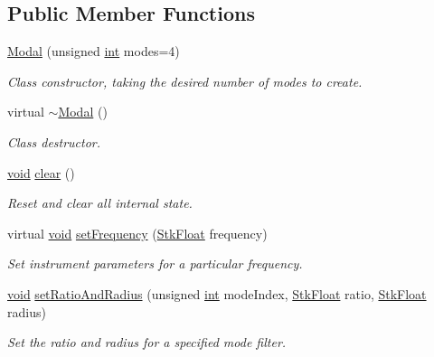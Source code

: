 \subsection*{Public Member Functions}
\begin{DoxyCompactItemize}
\item 
\hyperlink{class_nyq_1_1_modal_a2faf9b2ff8f531a0436972d9abb8fe3d}{Modal} (unsigned \hyperlink{xmltok_8h_a5a0d4a5641ce434f1d23533f2b2e6653}{int} modes=4)
\begin{DoxyCompactList}\small\item\em Class constructor, taking the desired number of modes to create. \end{DoxyCompactList}\item 
virtual \hyperlink{class_nyq_1_1_modal_a4a2e7830211c07075078b5d5186dab54}{$\sim$\+Modal} ()
\begin{DoxyCompactList}\small\item\em Class destructor. \end{DoxyCompactList}\item 
\hyperlink{sound_8c_ae35f5844602719cf66324f4de2a658b3}{void} \hyperlink{class_nyq_1_1_modal_a9d671eab5149887fde642780f3c1e861}{clear} ()
\begin{DoxyCompactList}\small\item\em Reset and clear all internal state. \end{DoxyCompactList}\item 
virtual \hyperlink{sound_8c_ae35f5844602719cf66324f4de2a658b3}{void} \hyperlink{class_nyq_1_1_modal_a2e85b4e6849225b2e8a5b0ed8430c926}{set\+Frequency} (\hyperlink{namespace_nyq_a044fa20a706520a617bbbf458a7db7e4}{Stk\+Float} frequency)
\begin{DoxyCompactList}\small\item\em Set instrument parameters for a particular frequency. \end{DoxyCompactList}\item 
\hyperlink{sound_8c_ae35f5844602719cf66324f4de2a658b3}{void} \hyperlink{class_nyq_1_1_modal_aeac4c4bea54d66ef56e8bf5369849702}{set\+Ratio\+And\+Radius} (unsigned \hyperlink{xmltok_8h_a5a0d4a5641ce434f1d23533f2b2e6653}{int} mode\+Index, \hyperlink{namespace_nyq_a044fa20a706520a617bbbf458a7db7e4}{Stk\+Float} ratio, \hyperlink{namespace_nyq_a044fa20a706520a617bbbf458a7db7e4}{Stk\+Float} radius)
\begin{DoxyCompactList}\small\item\em Set the ratio and radius for a specified mode filter. \end{DoxyCompactList}\item 

\end{DoxyCompactItemize}
